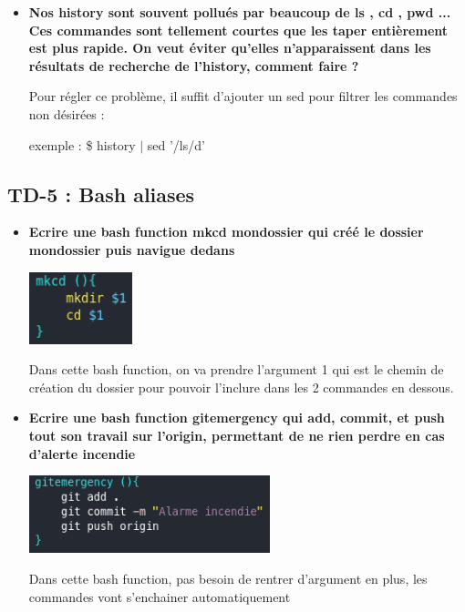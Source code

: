 \documentclass[12pt]{article}
\begin{document}
\begin{itemize}
  \item \textbf{Nos history sont souvent pollués par beaucoup de ls , cd , pwd ...
  Ces commandes sont tellement courtes que les taper entièrement est plus rapide.
  On veut éviter qu'elles n'apparaissent dans les résultats de recherche de
  l'history, comment faire ?}
  \vspace{0.3cm}

  Pour régler ce problème, il suffit d'ajouter un sed pour filtrer les commandes non désirées : \newline

  exemple : \$ history $|$ sed '/ls/d'

\end{itemize}

  \subsection{TD-5 : Bash aliases}
\vspace{0.3cm}

\begin{itemize}
  \item \textbf{Ecrire une bash function mkcd mondossier qui créé le dossier mondossier
  puis navigue dedans}
  \vspace{0.3cm}

  \includegraphics[width=3cm]{images/screen-mkcd-td5.png}
  \vspace{0.3cm}

  Dans cette bash function, on va prendre l'argument 1 qui est le chemin de création du dossier pour pouvoir
  l'inclure dans les 2 commandes en dessous.

\end{itemize}

\vspace{0.3cm}

\begin{itemize}
  \item \textbf{Ecrire une bash function gitemergency qui add, commit, et push tout son
  travail sur l'origin, permettant de ne rien perdre en cas d'alerte incendie}
  \vspace{0.3cm}

  \includegraphics[width=7cm]{images/screen-gitemergency-td5.png}
  \vspace{0.3cm}

  Dans cette bash function, pas besoin de rentrer d'argument en plus, les commandes vont s'enchainer automatiquement
\end{itemize}
\end{document}
